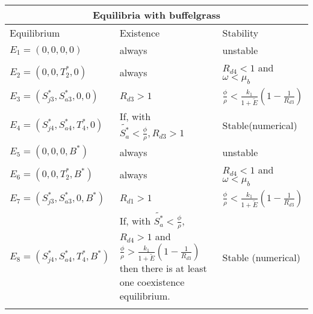 \setlength{\arrayrulewidth}{.5mm}
\setlength{\tabcolsep}{18pt}
\renewcommand{\arraystretch}{1.5}

\hspace{-.8cm}\begin{tabular}{ |p{3.55cm}|p{5cm}|p{4.5cm}|}
\hline
\multicolumn{3}{|c|}{Equilibria with buffelgrass} \\ 
\hline
Equilibrium & Existence & Stability \\
\hline
$E_1= (0,0,0,0)$ & always & unstable\\

$E_2= (0,0,T_2^*,0)$ & always & $R_{d4} < 1$ and $\omega<\mu_b$ \\

$E_3= (S_{j3}^*, S_{a3}^*, 0,0)$ & $R_{d3} > 1$ & $\displaystyle\frac {\phi}{\rho}<\displaystyle\frac{k_1}{1+\tilde{E}}\left(1-\displaystyle\frac{1}{R_{d3}}\right) $ \\

$E_4= (S_{j4}^*, S_{a4}^*, T_4^*, 0)$ & If, with $\tilde{S_a^*} < \displaystyle\frac{\phi}{\rho}, R_{d3} > 1$& Stable(numerical)\\


$E_5= (0,0,0,B^*)$ & always & unstable\\

$E_6= (0,0,T_2^*, B^*)$ & always & $R_{d4} < 1$ and $\omega<\mu_b$ \\

$E_7= (S_{j3}^*, S_{a3}^*, 0, B^*)$ & $ R_{d1} > 1$ & $\displaystyle\frac {\phi}{\rho}<\displaystyle\frac{k_1}{1+\tilde{E}}\left(1-\displaystyle\frac{1}{R_{d3}}\right) $ \\

$E_8=(S_{j4}^*,S_{a4}^*,T_4^*,B^*)$ & If, with $\tilde{S_a^*} < \frac{\phi}{\rho}$,$R_{d4} > 1$ and $\displaystyle\frac{\phi}{\rho} > \displaystyle\frac{k_1}{1+\tilde{E}}\left(1-\frac{1}{R_{d3}}\right)$ then there is at least one coexistence equilibrium. & Stable (numerical) \\

 & & \\
\hline

\end{tabular}